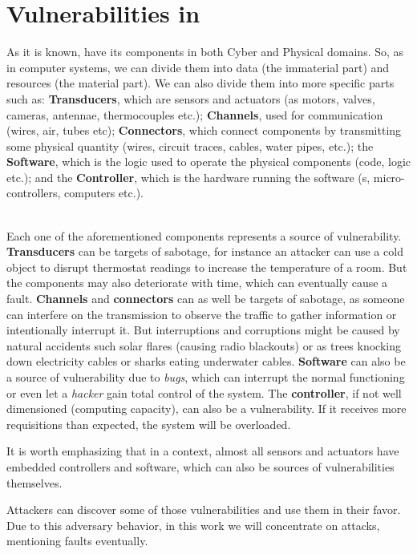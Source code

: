 \documentclass[../main.tex]{subfiles}
\begin{document}
\section{Vulnerabilities in \cps{}}

As it is known, \cps{} have its components in both Cyber and Physical domains.
So, as in computer systems, we can divide them into data (the immaterial part) and resources (the material part). We can also divide them into more specific parts such as: \textbf{Transducers}, which are sensors and actuators (as motors, valves, cameras, antennae, thermocouples etc.);
\textbf{Channels}, used for communication (wires, air, tubes etc); \textbf{Connectors}, which connect components by transmitting some physical quantity (wires, circuit traces, cables, water pipes, etc.);
the \textbf{Software}, which is the logic used to operate the physical components (code, \plc{} logic etc.); and the \textbf{Controller}, which is the hardware running the software (\plc{}s, micro-controllers, computers etc.).

~\\Each one of the aforementioned components represents a source of vulnerability.
\\\textbf{Transducers} can be targets of sabotage, for instance an attacker can use a cold object to disrupt thermostat readings to increase the temperature of a room. But the components may also deteriorate with time, which can eventually cause a fault.
\textbf{Channels} and \textbf{connectors} can as well be targets of sabotage, as someone can interfere on the transmission to observe the traffic to gather information or intentionally interrupt it. But interruptions and corruptions might be caused by natural accidents such solar flares (causing radio blackouts) or as trees knocking down electricity cables or sharks eating underwater cables.
\textbf{Software} can also be a source of vulnerability due to \emph{bugs}, which can interrupt the normal functioning or even let a \emph{hacker} gain total control of the system.
The \textbf{controller}, if not well dimensioned (computing capacity), can also be a vulnerability.
If it receives more requisitions than expected, the system will be overloaded.

It is worth emphasizing that in a \iot{} context, almost all sensors and actuators have embedded controllers and software, which can also be sources of vulnerabilities themselves.

Attackers can discover some of those vulnerabilities and use them in their favor. Due to this adversary behavior, in this work we will concentrate on attacks, mentioning faults eventually.
\end{document}
